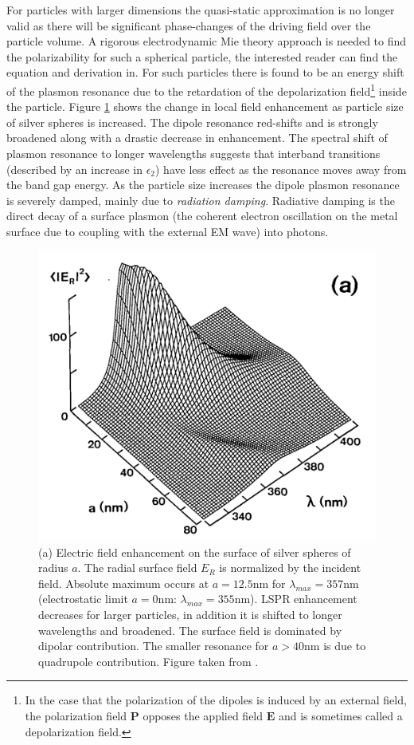 For particles with larger dimensions the quasi-static approximation is no longer valid as there will be significant phase-changes of the driving field over the particle volume. A rigorous electrodynamic Mie theory approach is needed to find the polarizability for such a spherical particle, the interested reader can find the equation and derivation in\cite{Kuwata2003}\cite{LargeParticlesLSPR_maier}. For such particles there is found to be an energy shift of the plasmon resonance due to the retardation of the depolarization field\footnote{In the case that the polarization of the dipoles is induced by an external field, the polarization field $\mathbf{P}$ opposes the applied field $\mathbf{E}$ and is sometimes called a depolarization field.} inside the particle\cite{LargeParticlesLSPR_maier}. Figure \ref{fig:LSPR_largeParticles} shows the change in local field enhancement as particle size of silver spheres is increased. The dipole resonance red-shifts and is strongly broadened along with a drastic decrease in enhancement. The spectral shift of plasmon resonance to longer wavelengths suggests that interband transitions (described by an increase in $\epsilon_2$) have less effect as the resonance moves away from the band gap energy\cite{maier}. %
As the particle size increases the dipole plasmon resonance is severely damped, mainly due to \emph{radiation damping}\cite{Wokaun_RadiationDamping}. Radiative damping is the direct decay of a surface plasmon (the coherent electron oscillation on the metal surface due to coupling with the external EM wave) into photons\cite{Kokkinakis_RadiativeDecay}.
\begin{figure}
    \centering
    \includegraphics[width=0.5\linewidth]{figures/Ch2/LSPR_on_largeparticles.png}
    \caption{(a) Electric field enhancement on the surface of silver spheres of radius $a$. The radial surface field $E_R$ is normalized by the incident field. Absolute maximum occurs at $a=12.5$nm for $\lambda_{max}=357$nm (electrostatic limit $a=0$nm: $\lambda_{max}=355$nm). LSPR enhancement decreases for larger particles, in addition it is shifted to longer wavelengths and broadened. The surface field is dominated by dipolar contribution. The smaller resonance for $a>40$nm is due to quadrupole contribution. Figure taken from \cite{LargeParticlesLSPR_maier}.}
    \label{fig:LSPR_largeParticles}
\end{figure}

